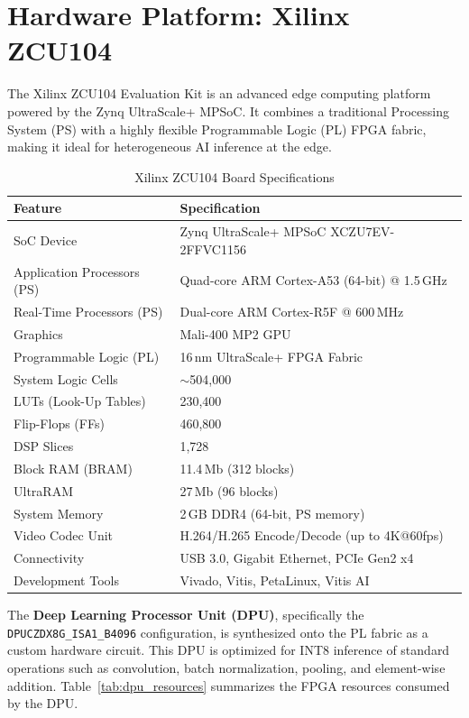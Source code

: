 \documentclass[12pt, a4paper]{report}
\begin{document}
\section{Hardware Platform: Xilinx ZCU104}

The Xilinx ZCU104 Evaluation Kit is an advanced edge computing platform powered by the Zynq UltraScale+ MPSoC. It combines a traditional Processing System (PS) with a highly flexible Programmable Logic (PL) FPGA fabric, making it ideal for heterogeneous AI inference at the edge.

\begin{table}[H]
\centering
\caption{Xilinx ZCU104 Board Specifications}
\label{tab:zcu104_specs}
\begin{tabular}{@{}p{5cm} p{9cm}@{}}
\toprule
\textbf{Feature} & \textbf{Specification} \\
\midrule
SoC Device & Zynq UltraScale+ MPSoC XCZU7EV-2FFVC1156 \\
Application Processors (PS) & Quad-core ARM Cortex-A53 (64-bit) @ 1.5\,GHz \\
Real-Time Processors (PS) & Dual-core ARM Cortex-R5F @ 600\,MHz \\
Graphics & Mali-400 MP2 GPU \\
Programmable Logic (PL) & 16\,nm UltraScale+ FPGA Fabric \\
System Logic Cells & $\sim$504,000 \\
LUTs (Look-Up Tables) & 230,400 \\
Flip-Flops (FFs) & 460,800 \\
DSP Slices & 1,728 \\
Block RAM (BRAM) & 11.4\,Mb (312 blocks) \\
UltraRAM & 27\,Mb (96 blocks) \\
System Memory & 2\,GB DDR4 (64-bit, PS memory) \\
Video Codec Unit & H.264/H.265 Encode/Decode (up to 4K@60fps) \\
Connectivity & USB 3.0, Gigabit Ethernet, PCIe Gen2 x4 \\
Development Tools & Vivado, Vitis, PetaLinux, Vitis AI \\
\bottomrule
\end{tabular}
\end{table}

The \textbf{Deep Learning Processor Unit (DPU)}, specifically the \texttt{DPUCZDX8G\_ISA1\_B4096} configuration, is synthesized onto the PL fabric as a custom hardware circuit. This DPU is optimized for INT8 inference of standard operations such as convolution, batch normalization, pooling, and element-wise addition. Table~\ref{tab:dpu_resources} summarizes the FPGA resources consumed by the DPU.
\end{document}
